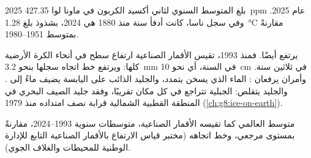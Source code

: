 \begin{dated}{2025}
بلغ المتوسط السنوي لثاني أكسيد الكربون في ماونا لوا \qty{427.35}{ppm} عام
2025. وفي سجل ناسا، كانت أدفأ سنة منذ 1880 هي 2024، بشذوذ بلغ
\qty{1.28}{\degreeCelsius} مقارنةً بمتوسط 1951--1980.
\end{dated}

 يرتفع أيضًا. فمنذ 1993، تقيس الأقمار الصناعية ارتفاع سطح  في أنحاء
الكرة الأرضية كلها: ويرتفع خط اتجاه سجلها بنحو \qty{3.2}{mm} في السنة، أي نحو
\qty{10}{cm} في ثلاثين سنة. وأمران يرفعان : الماء الذي يسخن يتمدد، والجليد
الذائب على اليابسة يضيف ماءً إلى . والجليد يتقلص: 
الجبلية تتراجع في كل مكان تقريبًا، وفقد جليد الصيف البحري في المنطقة القطبية
الشمالية قرابة نصف امتداده منذ 1979 (\cref{ch:g8:ice-on-earth}).

\begin{omfigure}

{\small متوسط  العالمي كما تقيسه الأقمار الصناعية، متوسطات سنوية
1993--2024، مقارنةً بمستوى مرجعي، وخط اتجاهه (مختبر قياس الارتفاع بالأقمار
الصناعية التابع للإدارة الوطنية للمحيطات والغلاف الجوي).}
\label{fig:g9:climate-past-and-present:sea}
\end{omfigure}

